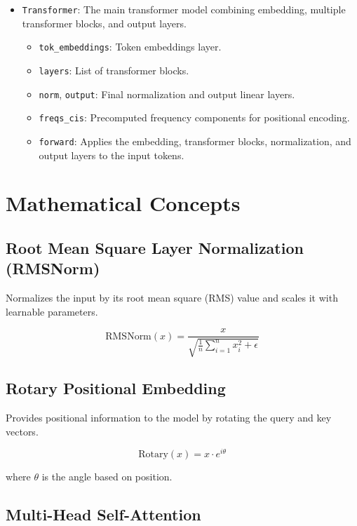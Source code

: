 \begin{itemize}
    \item \texttt{Transformer}: The main transformer model combining embedding, multiple transformer blocks, and output layers.
    \begin{itemize}
        \item \texttt{tok\_embeddings}: Token embeddings layer.
        \item \texttt{layers}: List of transformer blocks.
        \item \texttt{norm}, \texttt{output}: Final normalization and output linear layers.
        \item \texttt{freqs\_cis}: Precomputed frequency components for positional encoding.
        \item \texttt{forward}: Applies the embedding, transformer blocks, normalization, and output layers to the input tokens.
    \end{itemize}
\end{itemize}

\section{Mathematical Concepts}

\subsection{Root Mean Square Layer Normalization (RMSNorm)}

Normalizes the input by its root mean square (RMS) value and scales it with learnable parameters.

\begin{equation}
\text{RMSNorm}(x) = \frac{x}{\sqrt{\frac{1}{n} \sum_{i=1}^n x_i^2 + \epsilon}}
\end{equation}

\subsection{Rotary Positional Embedding}

Provides positional information to the model by rotating the query and key vectors.

\begin{equation}
\text{Rotary}(x) = x \cdot e^{i \theta}
\end{equation}

where \( \theta \) is the angle based on position.

\subsection{Multi-Head Self-Attention}

